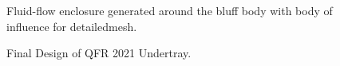 \begin{figure}[!htbp]
    \centering
    \noindent{}
    \caption{Fluid-flow enclosure generated around the bluff body with body of influence for detailedmesh.}
    \label{fig:UTP_ISO_QCRIT_ALL_COMPARE}
\end{figure}

\begin{figure}[!htbp]
    \centering
    \noindent{}
    \caption{Final Design of QFR 2021 Undertray.}
    \label{fig:UTP2_FINAL_DESIGN}
\end{figure}